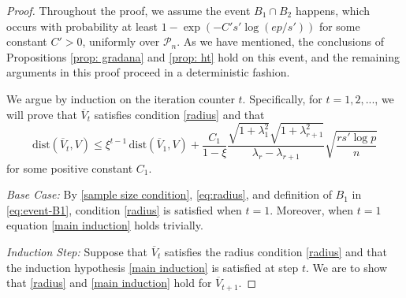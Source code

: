 \documentclass[11pt]{article}
\newcommand{\nb}[1]{\textcolor{orange}{\texttt{[#1]}}}
\newcommand{\scale}{V}
\newcommand{\gd}{\overline{V}}
\newcommand{\0}{{\mathbf{0}}}
\begin{document}
\begin{proof}
Throughout the proof, we assume the event $B_1\cap B_2$ happens, 
which occurs with probability at least $1-\exp(-C's'\log (ep/s'))$ for some constant $C'>0$, {  uniformly over $\mathcal{P}_n$}. 
As we have mentioned, the conclusions of Propositions \ref{prop: gradana} and \ref{prop: ht} hold on this event,
and the remaining arguments in this proof proceed in a deterministic fashion.

We argue by induction on the iteration counter $t$. 
Specifically, for $t=1,2,...$, we will prove that $\gd_t$ satisfies condition \eqref{radius} and that \begin{equation}\label{main induction}
\mathrm{dist}(\gd_{t},\scale)
 \leq\xi^{t-1}\,\mathrm{dist}(\gd_1,\scale)
+\frac{C_1}{1-\xi}
\frac{\sqrt{1+\lambda_1^2}\sqrt{{1+\lambda_{r+1}^2}}}{\lambda_r-\lambda_{r+1}}\sqrt{\frac{rs'\log p}{n}}
\end{equation}
for some positive constant $C_1$.

\par\textit{Base Case:}
By \eqref{sample size condition}, \eqref{eq:radius}, 
and definition of $B_1$ in \eqref{eq:event-B1},
condition \eqref{radius} is satisfied when $t = 1$. 
Moreover, when $t=1$ equation \eqref{main induction} holds trivially.

\smallskip

\par\textit{Induction Step:}
Suppose that $\gd_{t}$ satisfies the radius condition \eqref{radius} and that the induction hypothesis \eqref{main induction} is satisfied at step $t$. 
We are to show that \eqref{radius} and \eqref{main induction} hold for $\gd_{t+1}$.


\end{proof}
\end{document}
